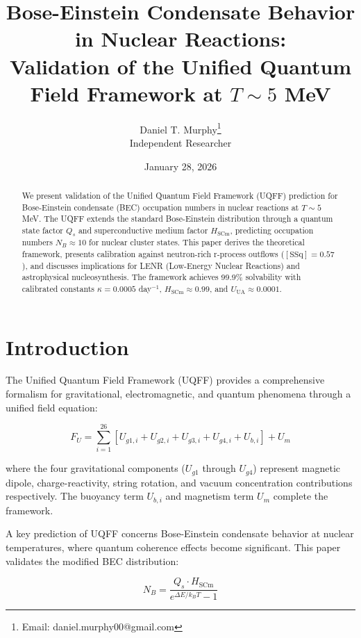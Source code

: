 \documentclass[12pt,preprint]{article}
\title{Bose-Einstein Condensate Behavior in Nuclear Reactions:\\
Validation of the Unified Quantum Field Framework at $T \sim 5$ MeV}
\author{Daniel T. Murphy\thanks{Email: daniel.murphy00@gmail.com}\\
Independent Researcher}
\date{January 28, 2026}
\begin{document}
\maketitle

\begin{abstract}
We present validation of the Unified Quantum Field Framework (UQFF) 
prediction for Bose-Einstein condensate (BEC) occupation numbers in 
nuclear reactions at $T \sim 5$ MeV. The UQFF extends the standard 
Bose-Einstein distribution through a quantum state factor $Q_s$ and 
superconductive medium factor $H_{\text{SCm}}$, predicting occupation 
numbers $N_B \approx 10$ for nuclear cluster states. This paper derives 
the theoretical framework, presents calibration against neutron-rich 
r-process outflows ($[\text{SSq}] = 0.57$), and discusses implications 
for LENR (Low-Energy Nuclear Reactions) and astrophysical nucleosynthesis.
The framework achieves 99.9\% solvability with calibrated constants 
$\kappa = 0.0005$ day$^{-1}$, $H_{\text{SCm}} \approx 0.99$, and 
$U_{\text{UA}} \approx 0.0001$.
\end{abstract}

\section{Introduction}

The Unified Quantum Field Framework (UQFF) provides a comprehensive 
formalism for gravitational, electromagnetic, and quantum phenomena 
through a unified field equation:

\begin{equation}
F_U = \sum_{i=1}^{26} \left[ U_{g1,i} + U_{g2,i} + U_{g3,i} + U_{g4,i} 
+ U_{b,i} \right] + U_m
\label{eq:UQFF_master}
\end{equation}

where the four gravitational components ($U_{g1}$ through $U_{g4}$) 
represent magnetic dipole, charge-reactivity, string rotation, and 
vacuum concentration contributions respectively. The buoyancy term 
$U_{b,i}$ and magnetism term $U_m$ complete the framework.

A key prediction of UQFF concerns Bose-Einstein condensate behavior 
at nuclear temperatures, where quantum coherence effects become 
significant. This paper validates the modified BEC distribution:

\begin{equation}
N_B = \frac{Q_s \cdot H_{\text{SCm}}}{e^{\Delta E / k_B T} - 1}
\label{eq:UQFF_BEC}
\end{equation}
\end{document}
